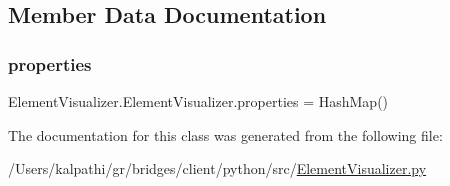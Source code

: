 \subsection{Member Data Documentation}
\hypertarget{class_element_visualizer_1_1_element_visualizer_a2c7c4e30a547a0269a4b918794068985}{}\label{class_element_visualizer_1_1_element_visualizer_a2c7c4e30a547a0269a4b918794068985} 
\subsubsection{\texorpdfstring{properties}{properties}}
{\footnotesize\ttfamily Element\+Visualizer.\+Element\+Visualizer.\+properties = Hash\+Map()\hspace{0.3cm}{\ttfamily [static]}}



The documentation for this class was generated from the following file\+:\begin{DoxyCompactItemize}
\item 
/\+Users/kalpathi/gr/bridges/client/python/src/\hyperlink{_element_visualizer_8py}{Element\+Visualizer.\+py}\end{DoxyCompactItemize}
